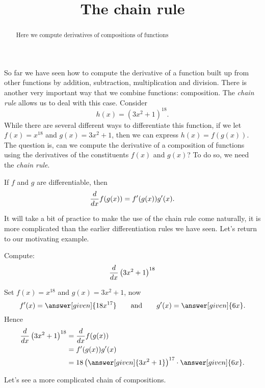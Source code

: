 \documentclass{ximera}
\title[Dig-In:]{The chain rule}
\begin{document}
\begin{abstract}
  Here we compute derivatives of compositions of functions
\end{abstract}
\maketitle


So far we have seen how to compute the derivative of a function built
up from other functions by addition, subtraction, multiplication and
division. There is another very important way that we combine
functions: composition. The \textit{chain rule} allows us to deal with
this case. Consider
\[
h(x) = \left(3x^2+1\right)^{18}.
\] 
While there are several different ways to differentiate this function,
if we let $f(x) = x^{18}$ and $g(x) = 3x^2+1$, then we can express
$h(x) = f(g(x))$. The question is, can we compute the derivative of a
composition of functions using the derivatives of the constituents
$f(x)$ and $g(x)$? To do so, we need the \textit{chain rule}.



\begin{theorem}
If $f$ and $g$ are differentiable, then
\[
\frac{d}{\mathop{}\!d x} f(g(x)) = f'(g(x))g'(x).
\]
\end{theorem}



It will take a bit of practice to make the use of the chain rule come
naturally, it is more complicated than the earlier differentiation
rules we have seen. Let's return to our motivating example.

\begin{example}
Compute:
\[
\frac{d}{\mathop{}\!d x} \left(3x^2+1\right)^{18}
\]

\begin{explanation}
Set $f(x) = x^{18}$ and $g(x) = 3x^2+1$, now
\[
f'(x) = \answer[given]{18x^{17}} \qquad\text{and}\qquad g'(x) = \answer[given]{6x}.
\]
Hence
\begin{align*}
\ddx \left(3x^2+1\right)^{18} &= \ddx f(g(x))\\ 
&=f'(g(x))g'(x) \\
&= 18\left(\answer[given]{3x^2+1}\right)^{17}\cdot \answer[given]{6x}.
\end{align*}
\end{explanation}
\end{example}


Let's see a more complicated chain of compositions.
\end{document}
